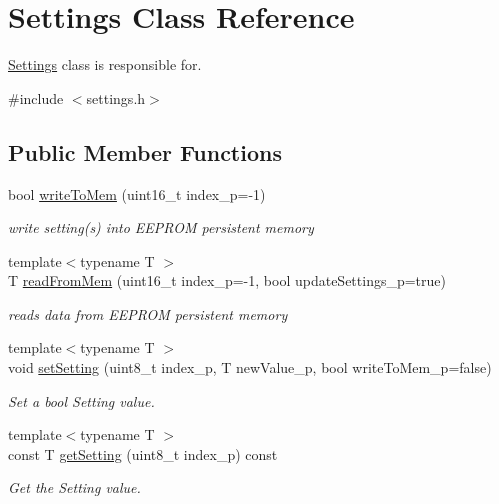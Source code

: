 \hypertarget{class_settings}{}\section{Settings Class Reference}
\label{class_settings}


\hyperlink{class_settings}{Settings} class is responsible for.  




{\ttfamily \#include $<$settings.\+h$>$}

\subsection*{Public Member Functions}
\begin{DoxyCompactItemize}
\item 
bool \hyperlink{class_settings_a513f67eb1af1a2ca93bebddfce8e1e0a}{write\+To\+Mem} (uint16\+\_\+t index\+\_\+p=-\/1)
\begin{DoxyCompactList}\small\item\em write setting(s) into E\+E\+P\+R\+OM persistent memory \end{DoxyCompactList}\item 
{\footnotesize template$<$typename T $>$ }\\T \hyperlink{class_settings_a49f0ce2f4dbff5b59f4b8658a06b49bb}{read\+From\+Mem} (uint16\+\_\+t index\+\_\+p=-\/1, bool update\+Settings\+\_\+p=true)
\begin{DoxyCompactList}\small\item\em reads data from E\+E\+P\+R\+OM persistent memory \end{DoxyCompactList}\item 
{\footnotesize template$<$typename T $>$ }\\void \hyperlink{class_settings_ab5a7de6e9d4f0b59d9cf93957e33cf49}{set\+Setting} (uint8\+\_\+t index\+\_\+p, T new\+Value\+\_\+p, bool write\+To\+Mem\+\_\+p=false)
\begin{DoxyCompactList}\small\item\em Set a bool Setting value. \end{DoxyCompactList}\item 
{\footnotesize template$<$typename T $>$ }\\const T \hyperlink{class_settings_a61df1edd21940600c4c6647adb177a91}{get\+Setting} (uint8\+\_\+t index\+\_\+p) const
\begin{DoxyCompactList}\small\item\em Get the Setting value. \end{DoxyCompactList}\end{DoxyCompactItemize}


